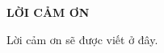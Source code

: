 \documentclass[../main.tex]{subfiles}
\begin{document}
\begin{center}
    \Large{\textbf{LỜI CẢM ƠN}}\\
\end{center}
\vspace{1cm}

Lời cảm ơn sẽ được viết ở đây.
\end{document}

